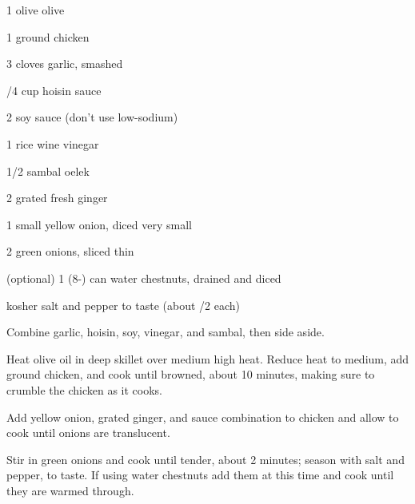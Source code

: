 \begin{IngredientsAndSteps}
    \ListIngredientsAndSteps
    {
        1 \Tbl olive olive

        1 \Pd ground chicken

        3 cloves garlic, smashed

        /4 cup hoisin sauce

        2 \Tbl[s] soy sauce (don't use low-sodium)

        1 \Tbl rice wine vinegar

        1/2 \Tbl[s] sambal oelek

        2 \Tbl[s] grated fresh ginger

        1 small yellow onion, diced very small

        2 green onions, sliced thin

        (optional) 1 (8-\Ounce) can water chestnuts, drained and diced

        kosher salt and pepper to taste (about /2 \tsp each)
    }
    {
        Combine garlic, hoisin, soy, vinegar, and sambal, then side aside.

        Heat olive oil in deep skillet over medium high heat. Reduce heat to medium, add ground chicken,
        and cook until browned, about 10 minutes, making sure to crumble the chicken as it cooks.

        Add yellow onion, grated ginger, and sauce combination to chicken and allow to cook until
        onions are translucent.

        Stir in green onions and cook until tender, about 2 minutes; season with salt
        and pepper, to taste. If using water chestnuts add them at this time and cook
        until they are warmed through.
    }
\end{IngredientsAndSteps}

%
%
%
%
\newpage



